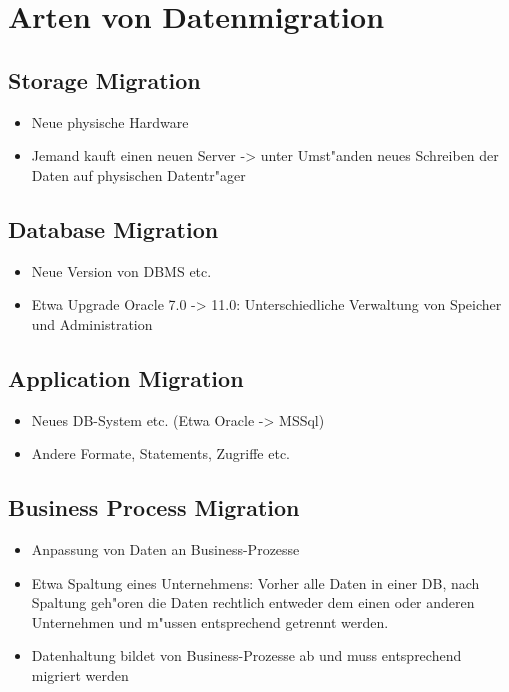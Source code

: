 \documentclass[11pt]{scrartcl}
\begin{document}
\section{Arten von Datenmigration}

\subsection{Storage Migration}

\begin{itemize}
	\item Neue physische Hardware
	\item Jemand kauft einen neuen Server -> unter Umst"anden neues Schreiben der Daten auf physischen Datentr"ager
\end{itemize}

\subsection{Database Migration}

\begin{itemize}
	\item Neue Version von DBMS etc.
	\item Etwa Upgrade Oracle 7.0 -> 11.0: Unterschiedliche Verwaltung von Speicher und Administration
\end{itemize}

\subsection{Application Migration}

\begin{itemize}
	\item Neues DB-System etc. (Etwa Oracle -> MSSql)
	\item Andere Formate, Statements, Zugriffe etc.
\end{itemize}

\subsection{Business Process Migration}

\begin{itemize}
	\item Anpassung von Daten an Business-Prozesse
	\item Etwa Spaltung eines Unternehmens: Vorher alle Daten in einer DB, nach Spaltung geh"oren die Daten rechtlich entweder dem einen oder anderen Unternehmen und m"ussen entsprechend getrennt werden.
	\item Datenhaltung bildet von Business-Prozesse ab und muss entsprechend migriert werden
\end{itemize}
\end{document}
